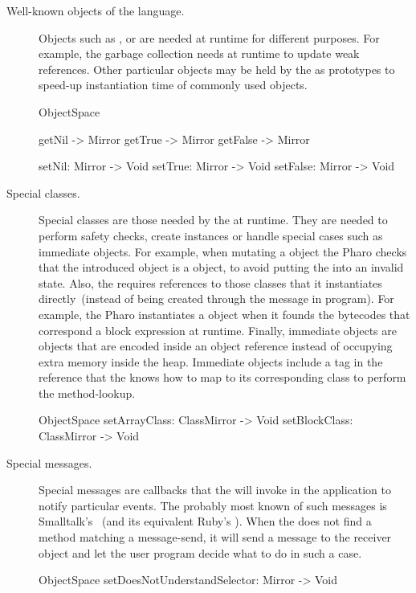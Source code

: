\begin{description}
\item[Well-known objects of the language.] Objects such as ,  or  are needed at runtime for different purposes. For example, the garbage collection needs  at runtime to update weak references. Other particular objects may be held by the \VM as prototypes to speed-up instantiation time of commonly used objects.


\begin{code}
ObjectSpace {
    getNil -> Mirror
    getTrue -> Mirror
    getFalse -> Mirror

    setNil: Mirror -> Void
    setTrue: Mirror -> Void
    setFalse: Mirror -> Void
}
\end{code}

\item[Special classes.] Special classes are those needed by the \VM at runtime. They are needed to perform safety checks, create instances or handle special cases such as immediate objects. For example, when mutating a  object the Pharo \VM checks that the introduced object is a  object, to avoid putting the  into an invalid state. Also, the \VM requires references to those classes that it instantiates directly~(instead of being created through the  message in program). For example, the Pharo \VM instantiates a  object when it founds the bytecodes that correspond a block expression at runtime. Finally, immediate objects are objects that are encoded inside an object reference instead of occupying extra memory inside the heap. Immediate objects include a tag in the reference that the \VM knows how to map to its corresponding class to perform the method-lookup. 

\begin{code}
ObjectSpace {
    setArrayClass: ClassMirror -> Void
    setBlockClass: ClassMirror -> Void
}
\end{code}

\item[Special messages.] Special messages are callbacks that the \VM will invoke in the application to notify particular events. The probably most known of such messages is Smalltalk's ~(and its equivalent Ruby's ). When the \VM does not find a method matching a message-send, it will send a  message to the receiver object and let the user program decide what to do in such a case.

\begin{code}
ObjectSpace {
    setDoesNotUnderstandSelector: Mirror -> Void
}
\end{code}

\end{description}

